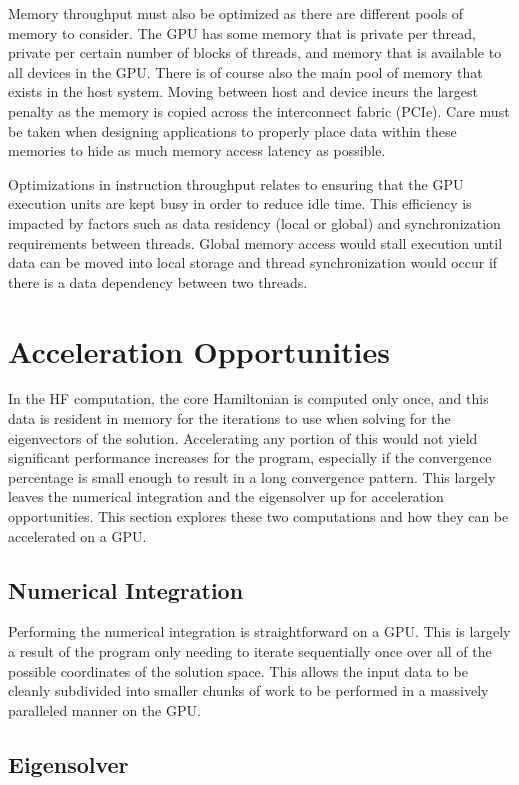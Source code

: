 \documentclass[conference, twoside]{IEEEtran}
\begin{document}
Memory throughput must also be optimized as there are different pools of memory to consider. The GPU has some memory that is private per thread, private per certain number of blocks of threads, and memory that is available to all devices in the GPU. There is of course also the main pool of memory that exists in the host system. Moving between host and device incurs the largest penalty as the memory is copied across the interconnect fabric (PCIe). Care must be taken when designing applications to properly place data within these memories to hide as much memory access latency as possible.

Optimizations in instruction throughput relates to ensuring that the GPU execution units are kept busy in order to reduce idle time. This efficiency is impacted by factors such as data residency (local or global) and synchronization requirements between threads. Global memory access would stall execution until data can be moved into local storage and thread synchronization would occur if there is a data dependency between two threads.

\section{Acceleration Opportunities}

In the HF computation, the core Hamiltonian is computed only once, and this data is resident in memory for the iterations to use when solving for the eigenvectors of the solution. Accelerating any portion of this would not yield significant performance increases for the program, especially if the convergence percentage is small enough to result in a long convergence pattern. This largely leaves the numerical integration and the eigensolver up for acceleration opportunities. This section explores these two computations and how they can be accelerated on a GPU.

\subsection{Numerical Integration}

Performing the numerical integration is straightforward on a GPU. This is largely a result of the program only needing to iterate sequentially once over all of the possible coordinates of the solution space. This allows the input data to be cleanly subdivided into smaller chunks of work to be performed in a massively paralleled manner on the GPU.

\subsection{Eigensolver}
\end{document}
